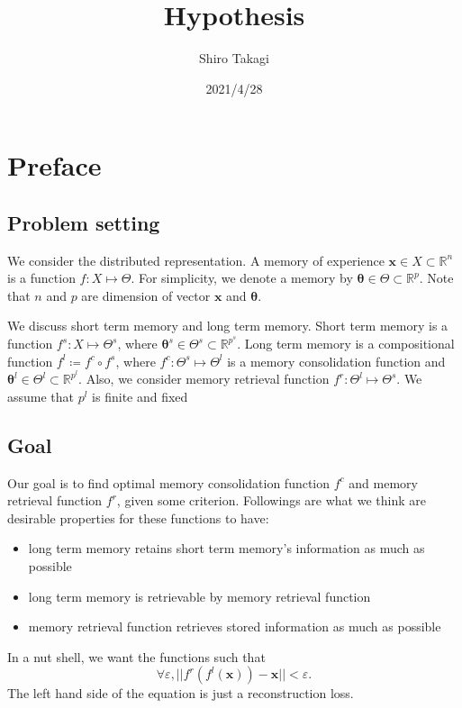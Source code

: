 \documentclass[12pt]{article}
\begin{document}
\title{Hypothesis}
\author{Shiro Takagi}
\date{2021/4/28}
\maketitle

\section{Preface}

\subsection{Problem setting}
We consider the distributed representation. A memory of experience $\bm{x} \in X \subset \mathbb{R}^n$
is a function $f: X \mapsto \Theta$. For simplicity, we denote a memory by $\bm{\theta} \in \Theta \subset \mathbb{R}^p$. 
Note that $n$ and $p$ are dimension of vector $\bm{x}$ and $\bm{\theta}$.

We discuss short term memory and long term memory. Short term memory is a function 
$f^s: X \mapsto \Theta^s$, where $\bm{\theta}^s \in \Theta^s \subset \mathbb{R}^{p^s}$. 
Long term memory is a compositional function $f^l \coloneqq f^c \circ f^s$, where $f^c: \Theta^s \mapsto \Theta^l$ 
is a memory consolidation function and $\bm{\theta}^l \in \Theta^l \subset \mathbb{R}^{p^l}$. Also, we consider 
memory retrieval function $f^r: \Theta^l \mapsto \Theta^s$. We assume that 
$p^l$ is finite and fixed

\subsection{Goal}
Our goal is to find optimal memory consolidation function $f^c$ and 
memory retrieval function $f^r$, given some criterion. 
Followings are what we think are desirable properties for these functions to have:
\begin{itemize}
    \item long term memory retains short term memory's information as much as possible 
    \item long term memory is retrievable by memory retrieval function
    \item memory retrieval function retrieves stored information as much as possible
\end{itemize} 
In a nut shell, we want the functions such that 
\begin{equation}
    \forall \varepsilon, || f^r(f^l(\bm{x})) - \bm{x} || < \varepsilon.
\end{equation}
The left hand side of the equation is just a reconstruction loss.
\end{document}
